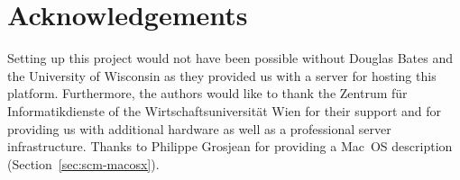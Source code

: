 \documentclass[a4paper]{article}
\begin{document}
\section{Acknowledgements}

Setting up this project would not have been possible without Douglas
Bates and the University of Wisconsin as they provided us with a
server for hosting this platform. Furthermore, 
the authors would like to thank the Zentrum f\"ur Informatikdienste  
of the Wirtschaftsuniversit\"at Wien for
their support and for providing us with additional hardware as well as a
professional server infrastructure. 
Thanks to Philippe Grosjean for
providing a Mac~OS description (Section~\ref{sec:scm-macosx}).




\end{document}
